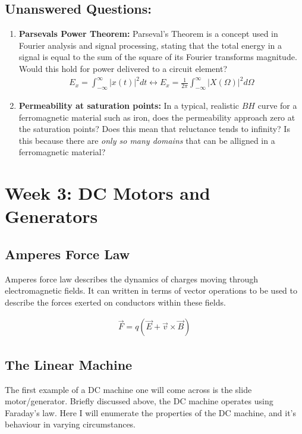 \documentclass{book}
\begin{document}
\subsection{Unanswered Questions:}

\begin{enumerate}
	\item \textbf{Parsevals Power Theorem:} Parseval's Theorem is a concept used in Fourier analysis and signal processing, stating that the total energy in a signal is equal to the sum of the square of its Fourier transforms magnitude. Would this hold for power delivered to a circuit element?
	\begin{align*}
		E_x = \int_{-\infty}^{\infty} |x(t)|^2 dt \leftrightarrow E_x = \frac{1}{2\pi} \int_{-\infty}^{\infty} |X(\Omega)|^2 d\Omega
	\end{align*}
	\item \textbf{Permeability at saturation points:} In a typical, realistic $BH$ curve for a ferromagnetic material such as iron, does the permeability approach zero at the saturation points? Does this mean that reluctance tends to infinity? Is this because there are \textit{only so many domains} that can be alligned in a ferromagnetic material?
\end{enumerate}
\newpage
\section{Week 3: DC Motors and Generators}

\subsection{Amperes Force Law}

Amperes force law describes the dynamics of charges moving through electromagnetic fields. It can written in terms of vector operations to be used to describe the forces exerted on conductors within these fields.

\begin{align*}
	\vec{F} = q (\vec{E} + \vec{v} \times \vec{B}) 
\end{align*}


\subsection{The Linear Machine}

The first example of a DC machine one will come across is the slide motor/generator. Briefly discussed above, the DC machine operates using Faraday's law. Here I will enumerate the properties of the DC machine, and it's behaviour in varying circumstances.
\end{document}
